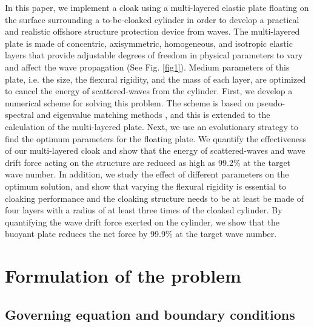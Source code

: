 \documentclass{jfm}
\begin{document}
{In this paper, we implement a cloak using a multi-layered elastic plate floating on the surface surrounding a to-be-cloaked cylinder in order to develop a practical and realistic offshore structure protection device from waves. 
The multi-layered plate is made of concentric, axisymmetric, homogeneous, and isotropic elastic layers that provide adjustable degrees of freedom in physical parameters to vary and affect the wave propagation (See Fig. \ref{fig1}). Medium parameters of this plate, i.e. the size, the flexural rigidity, and the mass of each layer, are optimized to cancel the energy of scattered-waves from the cylinder. First, we develop a numerical scheme for solving this problem. 
The scheme is based on pseudo-spectral and eigenvalue matching methods \cite[]{Peter2004}, and this is extended to the calculation of the multi-layered plate.
Next, we use an evolutionary strategy to find the optimum parameters for the floating plate.
We quantify the effectiveness of our multi-layered cloak and show that the energy of scattered-waves and wave drift force acting on the structure are reduced as high as 99.2\% at the target wave number. In addition, we study the effect of different parameters on the optimum solution, and show that varying the flexural rigidity is essential to cloaking performance and the cloaking structure needs to be at least be made of four layers with a radius of at least three times of the cloaked cylinder. By quantifying the wave drift force exerted on the cylinder, we show that the buoyant plate reduces the net force by 99.9\% at the target wave number.}


\section{Formulation of the problem}
\subsection{Governing equation and boundary conditions}
\end{document}
